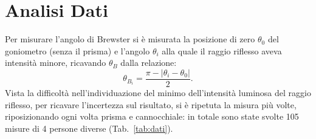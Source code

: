 \documentclass[10pt,twocolumn]{article}
\begin{document}
\section{Analisi Dati}
    Per misurare l'angolo di Brewster si è misurata la posizione di zero $\theta_0$ del goniometro (senza il prisma) e l'angolo $\theta_i$ alla quale il raggio riflesso aveva intensità minore, ricavando $\theta_B$ dalla relazione:
    \begin{equation}
        \theta_{B_i} = \frac{\pi - |\theta_i - \theta_0|}{2}.
        \label{eq:thB}
    \end{equation}
    Vista la difficoltà nell'individuazione del minimo dell'intensità luminosa del raggio riflesso, per ricavare l'incertezza sul risultato, si è ripetuta la misura più volte, riposizionando ogni volta prisma e cannocchiale: in totale
    sono state svolte 105 misure di 4 persone diverse (Tab.~\ref{tab:dati}).
\end{document}
